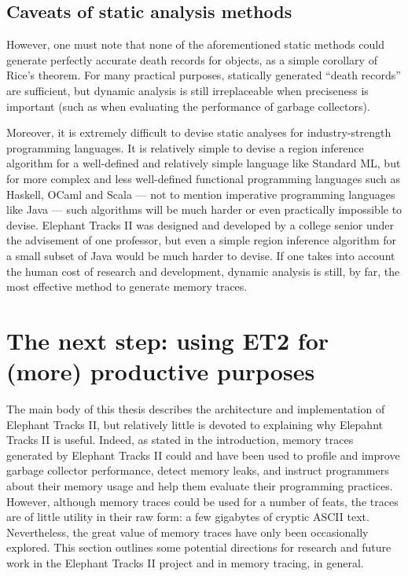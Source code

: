 \subsection{Caveats of static analysis methods}
However, one must note that none of the aforementioned static methods could generate perfectly accurate death records for objects,
as a simple corollary of Rice's theorem. For many practical purposes, statically generated ``death records'' are sufficient, but
dynamic analysis is still irreplaceable when preciseness is important (such as when evaluating the performance of garbage collectors).

Moreover, it is extremely difficult to devise static analyses for industry-strength programming languages. It is relatively simple
to devise a region inference algorithm for a well-defined and relatively simple language like Standard ML, but for more complex and
less well-defined functional programming languages such as Haskell, OCaml and Scala --- not to mention imperative programming
languages like Java --- such algorithms will be much harder or even practically impossible to devise. Elephant Tracks II was designed
and developed by a college senior under the advisement of one professor, but even a simple region inference algorithm for a
small subset of Java would be much harder to devise. If one takes into account the human cost of research and development, dynamic
analysis is still, by far, the most effective method to generate memory traces.

\section{The next step: using ET2 for (more) productive purposes}
The main body of this thesis describes the architecture and implementation of Elephant Tracks II, but relatively little is devoted to
explaining why Elepahnt Tracks II is useful. Indeed, as stated in the introduction, memory traces generated by Elephant Tracks II could
and have been used to profile and improve garbage collector performance, detect memory leaks, and instruct programmers about their memory
usage and help them evaluate their programming practices. However, although memory traces could be used for a number of feats, the traces
are of little utility in their raw form: a few gigabytes of cryptic ASCII text. Nevertheless, the great value of memory traces have only been
occasionally explored. This section outlines some potential directions for research and future work in the Elephant Tracks II project and in
memory tracing, in general.

